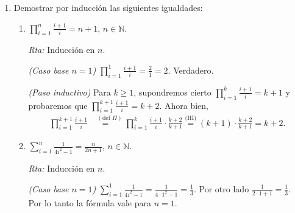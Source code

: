 \documentclass[a4paper,12pt,twoside,spanish,reqno]{amsbook}
\numberwithin{equation}{section}
\newcommand{\rta}{\noindent\textit{Rta: }}
\begin{document}
        \begin{enumerate}[resume]

            
        
            \item\label{ej-induccion} Demostrar por inducción  las siguientes igualdades:
            \begin{enumerate}
                \item  $\displaystyle{ \prod_{i=1}^n \frac{i+1}{i} = n+1}$, $n\in \mathbb N$.
                
                \rta Inducción en $n$.
                
                \textit{(Caso base $n=1$) } $\prod_{i=1}^1 \frac{i+1}{i} = \frac{2}{1} = 2$. Verdadero.   
                
                \textit{(Paso inductivo) }  Para  $k \ge 1$,  supondremos cierto $\prod_{i=1}^k \frac{i+1}{i} = k+1$ y probaremos que $\prod_{i=1}^{k+1} \frac{i+1}{i} = k+2$. Ahora bien,
                \begin{align*}
                    \prod_{i=1}^{k+1} \frac{i+1}{i} &\overset{(\text{def } \Pi)}{=\quad} \prod_{i=1}^k \frac{i+1}{i} \cdot \frac{k+2}{k+1} \overset{\text{(HI)}}{=} (k+1) \cdot \frac{k+2}{k+1} = k+2.
                \end{align*}
                
                
                \item $\displaystyle{ \sum_{i=1}^n \frac{1}{4i^2-1} = \frac{n}{2n+1}}$, $n\in \mathbb N$.
                
                \rta Inducción en $n$.
                
                \textit{(Caso base $n=1$) } $\sum_{i=1}^1 \frac{1}{4i^2-1} = \frac{1}{4\cdot 1^2-1} = \frac13$. Por otro lado $\frac{1}{2\cdot 1+1} = \frac13$. Por lo tanto la fórmula vale para $n=1$.  
                

\end{enumerate}
\end{enumerate}
\end{document}
